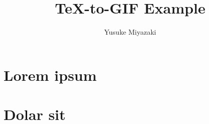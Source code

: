\documentclass[uplatex]{jsarticle}
\title{\TeX-to-GIF Example}
\author{Yusuke Miyazaki}
\begin{document}
\maketitle

\section{Lorem ipsum}
\lipsum[1-5]

\section{Dolar sit}
\lipsum[6-8]
\end{document}

